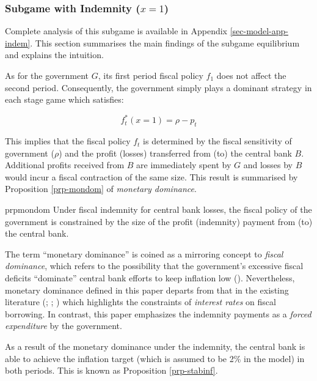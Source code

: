 \documentclass[
  a4paper,
  abstract=true]{scrartcl}
\theoremstyle{definition}
\begin{document}
\subsubsection{\texorpdfstring{Subgame with Indemnity
(\(x=1\))}{Subgame with Indemnity (x=1)}}\label{subgame-with-indemnity-x1}

Complete analysis of this subgame is available in Appendix
\ref{sec-model-app-indem}. This section summarises the main findings of
the subgame equilibrium and explains the intuition.

As for the government \(G\), its first period fiscal policy \(f_1\) does
not affect the second period. Consequently, the government simply plays
a dominant strategy in each stage game which satisfies:

\[
f_t^*(x=1)=\rho-p_t
\]

This implies that the fiscal policy \(f_t\) is determined by the fiscal
sensitivity of government (\(\rho\)) and the profit (losses) transferred
from (to) the central bank \(B\). Additional profits received from \(B\)
are immediately spent by \(G\) and losses by \(B\) would incur a fiscal
contraction of the same size. This result is summarised by Proposition
\ref{prp-mondom} of \emph{monetary dominance}.

\begin{restatable}{prp}{mondom}
\label{prp-mondom}
Under fiscal indemnity for central bank losses, the fiscal policy of the government is constrained by the size of the profit (indemnity) payment from (to) the central bank.
\end{restatable}

The term ``monetary dominance'' is coined as a mirroring concept to
\emph{fiscal dominance}, which refers to the possibility that the
government's excessive fiscal deficits ``dominate'' central bank efforts
to keep inflation low ().
Nevertheless, monetary dominance defined in this paper departs from that
in the existing literature (;
;
) which
highlights the constraints of \emph{interest rates} on fiscal borrowing.
In contrast, this paper emphasizes the indemnity payments as a
\emph{forced expenditure} by the government.

As a result of the monetary dominance under the indemnity, the central
bank is able to achieve the inflation target (which is assumed to be 2\%
in the model) in both periods. This is known as Proposition
\ref{prp-stabinf}.
\end{document}
